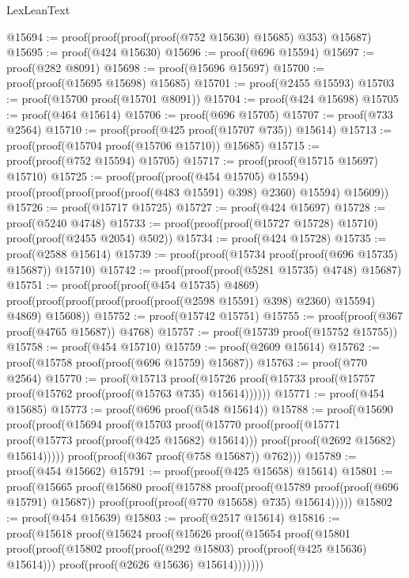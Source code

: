 \begin{lexlean}{LexLeanText}
\begin{coremodule}
@15694 := proof(proof(proof(proof(@752 @15630) @15685) @353) @15687)
@15695 := proof(@424 @15630)
@15696 := proof(@696 @15594)
@15697 := proof(@282 @8091)
@15698 := proof(@15696 @15697)
@15700 := proof(proof(@15695 @15698) @15685)
@15701 := proof(@2455 @15593)
@15703 := proof(@15700 proof(@15701 @8091))
@15704 := proof(@424 @15698)
@15705 := proof(@464 @15614)
@15706 := proof(@696 @15705)
@15707 := proof(@733 @2564)
@15710 := proof(proof(@425 proof(@15707 @735)) @15614)
@15713 := proof(proof(@15704 proof(@15706 @15710)) @15685)
@15715 := proof(proof(@752 @15594) @15705)
@15717 := proof(proof(@15715 @15697) @15710)
@15725 := proof(proof(proof(@454 @15705) @15594)
      proof(proof(proof(proof(proof(@483 @15591) @398) @2360) @15594) @15609))
@15726 := proof(@15717 @15725)
@15727 := proof(@424 @15697)
@15728 := proof(@5240 @4748)
@15733 := proof(proof(proof(@15727 @15728) @15710) proof(proof(@2455 @2054) @502))
@15734 := proof(@424 @15728)
@15735 := proof(@2588 @15614)
@15739 := proof(proof(@15734 proof(proof(@696 @15735) @15687)) @15710)
@15742 := proof(proof(proof(@5281 @15735) @4748) @15687)
@15751 := proof(proof(proof(@454 @15735) @4869)
      proof(proof(proof(proof(proof(proof(@2598 @15591) @398) @2360) @15594) @4869) @15608))
@15752 := proof(@15742 @15751)
@15755 := proof(proof(@367 proof(@4765 @15687)) @4768)
@15757 := proof(@15739 proof(@15752 @15755))
@15758 := proof(@454 @15710)
@15759 := proof(@2609 @15614)
@15762 := proof(@15758 proof(proof(@696 @15759) @15687))
@15763 := proof(@770 @2564)
@15770 := proof(@15713
      proof(@15726 proof(@15733 proof(@15757 proof(@15762 proof(proof(@15763 @735) @15614))))))
@15771 := proof(@454 @15685)
@15773 := proof(@696 proof(@548 @15614))
@15788 := proof(@15690
      proof(proof(@15694
            proof(@15703
                proof(@15770
                    proof(proof(@15771 proof(@15773 proof(proof(@425 @15682) @15614)))
                        proof(proof(@2692 @15682) @15614)))))
          proof(proof(@367 proof(@758 @15687)) @762)))
@15789 := proof(@454 @15662)
@15791 := proof(proof(@425 @15658) @15614)
@15801 := proof(@15665
      proof(@15680
          proof(@15788
              proof(proof(@15789 proof(proof(@696 @15791) @15687))
                  proof(proof(proof(@770 @15658) @735) @15614)))))
@15802 := proof(@454 @15639)
@15803 := proof(@2517 @15614)
@15816 := proof(@15618
      proof(@15624
          proof(@15626
              proof(@15654
                  proof(@15801
                      proof(proof(@15802 proof(proof(@292 @15803) proof(proof(@425 @15636) @15614)))
                          proof(proof(@2626 @15636) @15614)))))))

\end{coremodule}
\end{lexlean}
